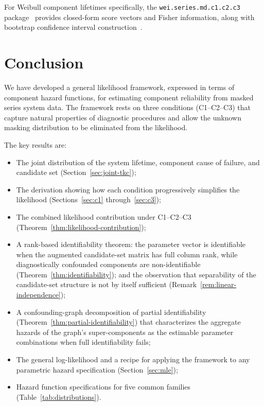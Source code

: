 \documentclass[11pt]{article}
\theoremstyle{definition}
\theoremstyle{plain}
\begin{document}
For Weibull component lifetimes specifically, the
\texttt{wei.series.md.c1.c2.c3}
package~\citep{towell2023weibull} provides closed-form score
vectors and Fisher information, along with bootstrap confidence
interval construction~\citep{towell2023algebraic-mle}.


\section{Conclusion}
\label{sec:conclusion}

We have developed a general likelihood framework, expressed in terms of
component hazard functions, for estimating component reliability from
masked series system data.
The framework rests on three conditions (C1--C2--C3) that capture natural
properties of diagnostic procedures and allow the unknown masking
distribution to be eliminated from the likelihood.

The key results are:
\begin{itemize}
    \item The joint distribution of the system lifetime, component cause
    of failure, and candidate set
    (Section~\ref{sec:joint-tkc});
    \item The derivation showing how each condition progressively
    simplifies the likelihood (Sections~\ref{sec:c1}
    through~\ref{sec:c3});
    \item The combined likelihood contribution under C1--C2--C3
    (Theorem~\ref{thm:likelihood-contribution});
    \item A rank-based identifiability theorem: the parameter vector is
    identifiable when the augmented candidate-set matrix has full column
    rank, while diagnostically confounded components are non-identifiable
    (Theorem~\ref{thm:identifiability}); and the observation that
    separability of the candidate-set structure is not by itself
    sufficient (Remark~\ref{rem:linear-independence});
    \item A confounding-graph decomposition of partial identifiability
    (Theorem~\ref{thm:partial-identifiability}) that characterizes the
    aggregate hazards of the graph's super-components as the estimable
    parameter combinations when full identifiability fails;
    \item The general log-likelihood and a recipe for applying the
    framework to any parametric hazard specification
    (Section~\ref{sec:mle});
    \item Hazard function specifications for five common families
    (Table~\ref{tab:distributions}).
\end{itemize}
\end{document}
